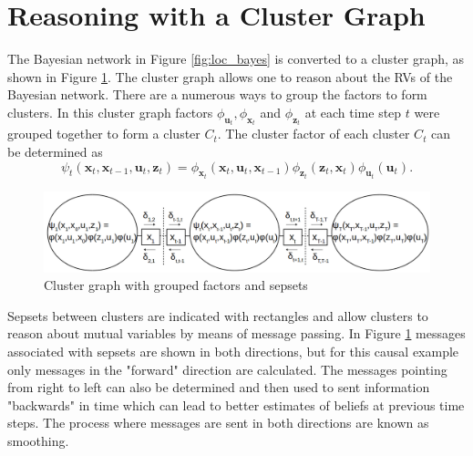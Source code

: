 \documentclass[12pt,oneside,openany,a4paper, %
afrikaans,english,
]{memoir}
\numberwithin{equation}{chapter}
\begin{document}
\section{Reasoning with a Cluster Graph}\label{sec:cluster}
The Bayesian network in Figure \ref{fig:loc_bayes} is converted to a cluster graph, as shown in Figure \ref{fig:loc_cluster}. The cluster graph allows one to reason about the RVs of the Bayesian network. There are a numerous ways to group the factors to form clusters. In this cluster graph factors $\phi_{\bm{u}_t}, \phi_{\bm{x}_t}$ and $\phi_{\bm{z}_t}$  at each time step $t$  were grouped together to form a cluster $C_t$. The cluster factor of each cluster $C_t$ can be determined as
\begin{equation}
\psi_t(\bm{x}_t, \bm{x}_{t-1}, \bm{u}_t, \bm{z}_t) = \phi_{\bm{x}_t}(\bm{x}_t,\bm{u}_t,\bm{x}_{t-1})\phi_{\bm{z}_t}(\bm{z}_t,\bm{x}_t)\phi_{\bm{u}_t}(\bm{u}_t).
\end{equation}

\begin{figure}
  \includegraphics[width=\linewidth]{Figures/loc_clustergraph.png}
  \centering
  \caption{Cluster graph with grouped factors and sepsets}
  \label{fig:loc_cluster}
\end{figure}

Sepsets between clusters are indicated with rectangles and allow clusters to reason about mutual variables by means of message passing. In Figure \ref{fig:loc_cluster} messages associated with sepsets are shown in both directions, but for this causal example only messages in the "forward" direction are calculated. The messages pointing from right to left can also be determined and then used to sent information "backwards" in time which can lead to better estimates of beliefs at previous time steps. The process where messages are sent in both directions are known as smoothing.
\end{document}
